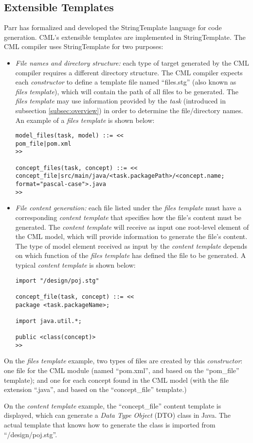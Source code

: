 \subsection{Extensible Templates}\label{subsec:templates}

Parr has formalized and developed the StringTemplate \cite{st} language for code generation.
CML's extensible templates are implemented in StringTemplate.
The CML compiler uses StringTemplate for two purposes:

\begin{itemize}

\item \emph{File names and directory structure:}
each type of target generated by the CML compiler requires a different directory structure.
The CML compiler expects each \emph{constructor} to define a template file named ``files.stg''
(also known as \emph{files template}),
which will contain the path of all files to be generated.
The \emph{files template} may use information provided by the \emph{task}
(introduced in subsection \ref{subsec:overview})
in order to determine the file/directory names.
An example of a \emph{files template} is shown below:
\verbatimfont{\scriptsize}
\begin{verbatim}
model_files(task, model) ::= <<
pom_file|pom.xml
>>

concept_files(task, concept) ::= <<
concept_file|src/main/java/<task.packagePath>/<concept.name; format="pascal-case">.java
>>
\end{verbatim}

\item \emph{File content generation:}
each file listed under the \emph{files template} must have a corresponding \emph{content template}
that specifies how the file's content must be generated.
The \emph{content template} will receive as input one root-level element of the CML model,
which will provide information to generate the file's content.
The type of model element received as input by the \emph{content template} depends on
which function of the \emph{files template} has defined the file to be generated.
A typical \emph{content template} is shown below:
\verbatimfont{\scriptsize}
\begin{verbatim}
import "/design/poj.stg"

concept_file(task, concept) ::= <<
package <task.packageName>;

import java.util.*;

public <class(concept)>
>>
\end{verbatim}

\end{itemize}

On the \emph{files template} example,
two types of files are created by this \emph{constructor}:
one file for the CML module (named ``pom.xml'', and based on the ``pom\_file'' template);
and one for each concept found in the CML model
(with the file extension ``.java'', and based on the ``concept\_file'' template.)

On the \emph{content template} example, the ``concept\_file'' content template is displayed,
which can generate a \emph{Data Type Object} (DTO) class in Java.
The actual template that knows how to generate the class is imported from ``/design/poj.stg''.
